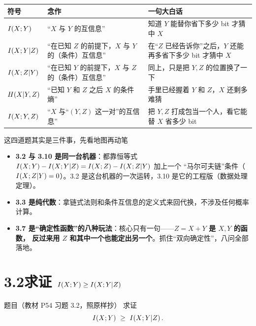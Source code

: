 \documentclass[11pt,a4paper]{ctexart}
\begin{document}
\begin{center}
\renewcommand{\arraystretch}{1.3}
\small
\begin{tabular}{@{}l >{\raggedright\arraybackslash}p{4.3cm} >{\raggedright\arraybackslash}p{8.0cm}@{}}
\toprule
符号 & 念作 & 一句大白话 \\
\midrule
$I\!\left(X;Y\right)$ & “$X$ 与 $Y$ 的互信息” & 知道 $Y$ 能替你省下多少 bit 才猜中 $X$ \\
$I\!\left(X;Y|Z\right)$ & “在已知 $Z$ 的前提下，$X$ 与 $Y$ 的（条件）互信息” &
在“$Z$ 已经告诉你”之后，$Y$ 还能再多省下多少 bit 才猜中 $X$ \\
$I\!\left(X;Z|Y\right)$ & “在已知 $Y$ 的前提下，$X$ 与 $Z$ 的（条件）互信息” & 同上，只是把 $Y,Z$ 的位置换了一下 \\
$H\!\left(X|Y,Z\right)$ & “已知 $Y$ 和 $Z$ 之后 $X$ 的条件熵” & 手里已经握着 $Y$ 和 $Z$，$X$ 还剩多难猜 \\
$I\!\left(X;Y,Z\right)$ & “$X$ 与“$(Y,Z)$ 这一对”的互信息” & 把 $Y,Z$ 打成包当一个人，看它能替 $X$ 省多少 bit \\
\bottomrule
\end{tabular}
\end{center}

\begin{qa}{这四道题其实是三件事，先看地图再动笔}
\begin{itemize}[leftmargin=1.5em,itemsep=1pt,topsep=1pt]
  \item \textbf{3.2 与 3.10 是同一台机器}：都靠恒等式 $I\!\left(X;Y\right)-I\!\left(X;Y|Z\right)=I\!\left(X;Z\right)-I\!\left(X;Z|Y\right)$ 加上一个
        “马尔可夫链”条件（$I\!\left(X;Z|Y\right)=0$）。3.2 是这台机器的一次运转，3.10 是它的工程版（数据处理定理）。
  \item \textbf{3.3 是纯代数}：拿链式法则和条件互信息的定义式来回代换，不涉及任何概率计算。
  \item \textbf{3.7 是“确定性函数”的八种玩法}：核心只有一句——\textbf{$Z=X+Y$ 是 $X,Y$ 的函数，
        反过来用 $Z$ 和其中一个也能定出另一个}。抓住“双向确定性”，八问全部落地。
\end{itemize}
\end{qa}

\section{3.2\quad 求证 $I\!\left(X;Y\right)\ge I\!\left(X;Y|Z\right)$}

\begin{defbox}{题目（教材 P54 习题 3.2，照原样抄）}
求证
\[
I\!\left(X;Y\right)\ \ge\ I\!\left(X;Y|Z\right).
\]
\end{defbox}
\end{document}

